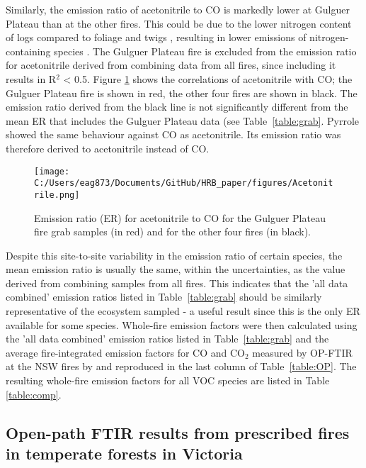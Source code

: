 \documentclass[acp, manuscript]{copernicus}
\begin{document}
Similarly, the emission ratio of acetonitrile to CO is markedly lower at Gulguer Plateau than at the other fires. This could be due to the lower nitrogen content of logs compared to foliage and twigs \citep{Susott1996,Snowdon2005}, resulting in lower emissions of nitrogen-containing species \citep{Coggon2016}. %
The Gulguer Plateau fire is excluded from the emission ratio for acetonitrile derived from combining data from all fires, since including it results in R$^2$ < 0.5. Figure \ref{fig:Acetonitrile} shows the correlations of acetonitrile with CO; the Gulguer Plateau fire is shown in red, the other four fires are shown in black. The emission ratio derived from the black line is not significantly different from the mean ER that includes the Gulguer Plateau data (see Table~\ref{table:grab}. 
Pyrrole showed the same behaviour against CO as acetonitrile. Its emission ratio was therefore derived to acetonitrile instead of CO.  

\begin{figure}
  \texttt{[image: C:/Users/eag873/Documents/GitHub/HRB\_paper/figures/Acetonitrile.png]}
  \caption{Emission ratio (ER) for acetonitrile to CO for the Gulguer Plateau fire grab samples (in red) and for the other four fires (in black).}
  \label{fig:Acetonitrile}
\end{figure}

Despite this site-to-site variability in the emission ratio of certain species, the mean emission ratio is usually the same, within the uncertainties, as the value derived from combining samples from all fires. 
This indicates that the 'all data combined' emission ratios listed in Table~\ref{table:grab} should be similarly representative of the ecosystem sampled - a useful result since this is the only ER available for some species. 
Whole-fire emission factors were then calculated using the 'all data combined' emission ratios listed in Table~\ref{table:grab} and the average fire-integrated emission factors for CO and CO$_2$ measured by OP-FTIR at the NSW fires by \citet{Paton-Walsh2014} and reproduced in the last column of Table~\ref{table:OP}. The resulting whole-fire emission factors for all VOC species are listed in Table \ref{table:comp}.  


\subsection{Open-path FTIR results from prescribed fires in temperate forests in Victoria }
\end{document}
